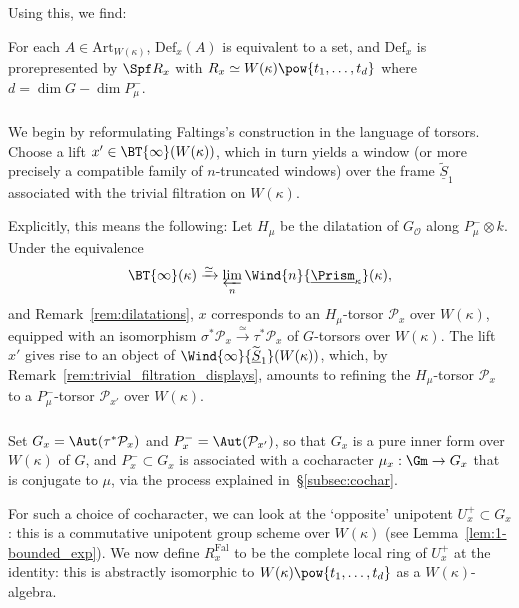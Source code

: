 \documentclass[10pt]{amsart}
\begin{document}
Using this, we find:
\begin{lemma}
\label{lem:discreteness_def_theory}
For each $A\in \mathrm{Art}_{W(\kappa)}$, $\mathrm{Def}_x(A)$ is equivalent to a set, and $\mathrm{Def}_x$ is prorepresented by $\Spf R_x$ with $R_x\simeq W(\kappa)\pow{t_1,\ldots,t_d}$ where $d = \dim G - \dim P_\mu^-$.
\end{lemma}

\subsubsection{}
We begin by reformulating Faltings's construction in the language of torsors. Choose a lift $x'\in \BT{\infty}(W(\kappa))$, which in turn yields a window (or more precisely a compatible family of $n$-truncated windows) over the frame $\widetilde{\underline{S}}_1$ associated with the trivial filtration on $W(\kappa)$. 

Explicitly, this means the following: Let $H_\mu$ be the dilatation of $G_{\mathcal{O}}$ along $P^-_\mu\otimes k$. Under the equivalence 
\[
\BT{\infty}(\kappa) \xrightarrow{\simeq}\varprojlim_n \Wind{n}{\underline{\Prism}_\kappa}(\kappa),
\]
and Remark~\ref{rem:dilatations}, $x$ corresponds to an $H_\mu$-torsor $\mathcal{P}_x$ over $W(\kappa)$, equipped with an isomorphism $\sigma^* \mathcal{P}_x\xrightarrow{\simeq}\tau^*\mathcal{P}_x$ of $G$-torsors over $W(\kappa)$. The lift $x'$ gives rise to an object of $\Wind{\infty}{\widetilde{\underline{S}}_1}(W(\kappa))$, which, by Remark~\ref{rem:trivial_filtration_displays}, amounts to refining the $H_\mu$-torsor $\mathcal{P}_x$ to a $P^-_\mu$-torsor $\mathcal{P}_{x'}$ over $W(\kappa)$.

\subsubsection{}
Set $G_x = \Aut(\tau^*\mathcal{P}_x)$ and $P^-_x = \Aut(\mathcal{P}_{x'})$, so that $G_x$ is a pure inner form over $W(\kappa)$ of $G$, and $P^-_x\subset G_x$ is associated with a cocharacter $\mu_x:\Gm\to G_x$ that is conjugate to $\mu$, via the process explained in~\S\ref{subsec:cochar}. 

For such a choice of cocharacter, we can look at the `opposite' unipotent $U^+_x\subset G_x$: this is a commutative unipotent group scheme over $W(\kappa)$ (see Lemma~\ref{lem:1-bounded_exp}). We now define $R^{\mathrm{Fal}}_x$ to be the complete local ring of $U^+_x$ at the identity: this is abstractly isomorphic to $W(\kappa)\pow{t_1,\ldots,t_d}$ as a $W(\kappa)$-algebra.
\end{document}
